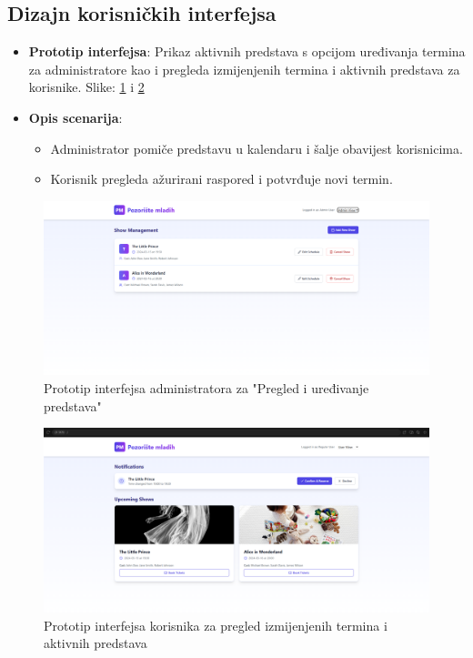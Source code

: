 \sloppy  
\subsection{Dizajn korisničkih interfejsa}  
\begin{itemize}  
    \item \textbf{Prototip interfejsa}: Prikaz aktivnih predstava s opcijom uređivanja termina za administratore kao i pregleda izmijenjenih termina i aktivnih predstava za korisnike. Slike: \ref{fig:adminView} i \ref{fig:userView}
    \item \textbf{Opis scenarija}:  
        \begin{itemize}  
            \item Administrator pomiče predstavu u kalendaru i šalje obavijest korisnicima.  
            \item Korisnik pregleda ažurirani raspored i potvrđuje novi termin.  
        \end{itemize}  
\end{itemize}   

\begin{figure}[H]
    \centering
    \includegraphics[width=1\textwidth]{Slike/adminView.PNG}
    \caption{Prototip interfejsa administratora za "Pregled i uređivanje predstava"}
    \label{fig:adminView}
\end{figure} 

\begin{figure}[H]
    \centering
    \includegraphics[width=1\textwidth]{Slike/userView.PNG}
    \caption{Prototip interfejsa korisnika za pregled izmijenjenih termina i aktivnih predstava}
    \label{fig:userView}
\end{figure}
